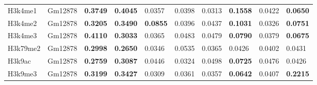\begin{table}[!ht]
\begin{tabular}{ll|ll|ll|ll|ll}
H3k4me1                              & Gm12878                                & {\color[HTML]{CB0000} \textbf{0.3749}}                       & {\color[HTML]{CB0000} \textbf{0.4045}}                      & 0.0357                                & 0.0398                               & 0.0313                                & {\color[HTML]{CB0000} \textbf{0.1558}} & 0.0422                                & \textbf{0.0650}                        \\
H3k4me2                              & Gm12878                                & {\color[HTML]{CB0000} \textbf{0.3205}}                       & {\color[HTML]{CB0000} \textbf{0.3490}}                      & \textbf{0.0855}                       & 0.0396                               & 0.0437                                & {\color[HTML]{CB0000} \textbf{0.1031}} & 0.0326                                & \textbf{0.0751}                        \\
H3k4me3                              & Gm12878                                & {\color[HTML]{CB0000} \textbf{0.4110}}                       & {\color[HTML]{CB0000} \textbf{0.3033}}                      & 0.0365                                & 0.0483                               & 0.0479                                & \textbf{0.0790}                        & 0.0379                                & \textbf{0.0675}                        \\
H3k79me2                             & Gm12878                                & {\color[HTML]{CB0000} \textbf{0.2998}}                       & {\color[HTML]{CB0000} \textbf{0.2650}}                      & 0.0346                                & 0.0535                               & 0.0365                                & 0.0426                                 & 0.0402                                & 0.0431                                 \\
H3k9ac                               & Gm12878                                & {\color[HTML]{CB0000} \textbf{0.2759}}                       & {\color[HTML]{CB0000} \textbf{0.3087}}                      & 0.0446                                & 0.0324                               & 0.0498                                & \textbf{0.0725}                        & 0.0476                                & 0.0426                                 \\
H3k9me3                              & Gm12878                                & {\color[HTML]{CB0000} \textbf{0.3199}}                       & {\color[HTML]{CB0000} \textbf{0.3427}}                      & 0.0309                                & 0.0361                               & 0.0357                                & \textbf{0.0642}                        & 0.0407                                & {\color[HTML]{CB0000} \textbf{0.2215}} \\

\end{tabular}
\end{table}
